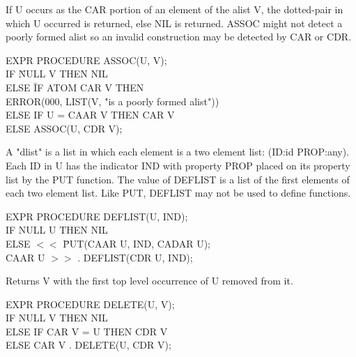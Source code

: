 {If U occurs as the CAR portion of an element of the alist V, the
dotted-pair in which U occurred is returned, else NIL is returned.
ASSOC might not detect a poorly formed alist so an invalid
 
construction may be detected by CAR or CDR.

{\tt \begin{tabbing} EXPR PROCEDURE ASSOC(U, V); \\
\hspace*{1em} IF \= NULL V THEN NIL \\
\> ELSE \= IF ATOM CAR V THEN \\
\> \> ERROR(000, LIST(V, "is a poorly formed alist")) \\
\> ELSE IF U = CAAR V THEN CAR V \\
\> ELSE ASSOC(U, CDR V);
\end{tabbing}}
}

{A "dlist" is a list in which each element is a two element list:
(ID:id PROP:any). Each ID in U has the indicator IND with property
PROP placed on its property list by the PUT function. The value of
DEFLIST is a list of the first elements of each two element list.
Like PUT, DEFLIST may not be used to define functions.

{\tt \begin{tabbing} EXPR PROCEDURE DEFLIST(U, IND); \\
\hspace*{1em} IF NULL U THEN NIL \\
\hspace*{2em} ELSE $<<$ \= PUT(CAAR U, IND, CADAR U); \\
\> CAAR U $>>$ . DEFLIST(CDR U, IND);
\end{tabbing}}
}

{Returns V with the first top level occurrence of U removed from it.

{\tt \begin{tabbing} EXPR PROCEDURE DELETE(U, V); \\
\hspace*{1em} IF NULL V THEN NIL \\
\hspace*{2em} ELSE IF CAR V = U THEN CDR V \\
\hspace*{2em} ELSE CAR V . DELETE(U, CDR V);
\end{tabbing}}}

